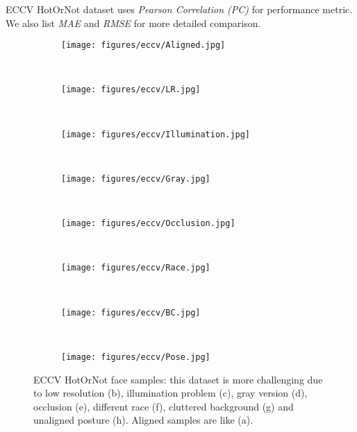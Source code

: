\documentclass[a4paper,conference]{IEEEtran}
\begin{document}
    ECCV HotOrNot dataset uses \emph{Pearson Correlation (PC)} for performance
    metric. We also list \emph{MAE} and \emph{RMSE} for more detailed comparison.

    \begin{figure}
    \centering
      \begin{subfigure}[b]{0.07\textwidth}
        \texttt{[image: figures/eccv/Aligned.jpg]}
        \caption{}
      \end{subfigure}
      ~
      \begin{subfigure}[b]{0.07\textwidth}
        \texttt{[image: figures/eccv/LR.jpg]}
        \caption{}
      \end{subfigure}
      ~
      \begin{subfigure}[b]{0.07\textwidth}
        \texttt{[image: figures/eccv/Illumination.jpg]}
        \caption{}
      \end{subfigure}
      ~
      \begin{subfigure}[b]{0.07\textwidth}
        \texttt{[image: figures/eccv/Gray.jpg]}
        \caption{}
      \end{subfigure}
      \\
      \begin{subfigure}[b]{0.07\textwidth}
        \texttt{[image: figures/eccv/Occlusion.jpg]}
        \caption{}
      \end{subfigure}
      ~
      \begin{subfigure}[b]{0.07\textwidth}
        \texttt{[image: figures/eccv/Race.jpg]}
        \caption{}
      \end{subfigure}
      ~
      \begin{subfigure}[b]{0.07\textwidth}
        \texttt{[image: figures/eccv/BC.jpg]}
        \caption{}
      \end{subfigure}
      ~
      \begin{subfigure}[b]{0.07\textwidth}
        \texttt{[image: figures/eccv/Pose.jpg]}
        \caption{}
      \end{subfigure}
      \caption{ECCV HotOrNot face samples: this dataset is more challenging due
            to low resolution (b), illumination problem (c), gray version (d),
            occlusion (e), different race (f), cluttered background (g) and
            unaligned posture (h). Aligned samples are like (a).}
      \label{fig:eccv dataset}
    \end{figure}
\end{document}
